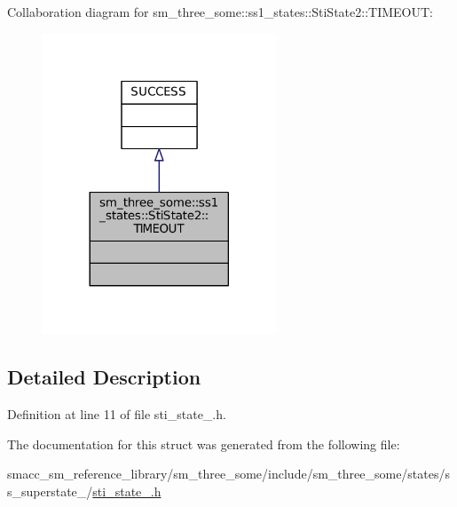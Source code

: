 Collaboration diagram for sm\+\_\+three\+\_\+some\+:\+:ss1\+\_\+states\+:\+:Sti\+State2\+:\+:T\+I\+M\+E\+O\+UT\+:
\nopagebreak
\begin{figure}[H]
\begin{center}
\leavevmode
\includegraphics[width=197pt]{structsm__three__some_1_1ss1__states_1_1StiState2_1_1TIMEOUT__coll__graph}
\end{center}
\end{figure}


\subsection{Detailed Description}


Definition at line 11 of file sti\+\_\+state\+\_.\+h.



The documentation for this struct was generated from the following file\+:\begin{DoxyCompactItemize}
\item 
smacc\+\_\+sm\+\_\+reference\+\_\+library/sm\+\_\+three\+\_\+some/include/sm\+\_\+three\+\_\+some/states/ss\+\_\+superstate\+\_/\hyperlink{sti__state__2_8h}{sti\+\_\+state\+\_.\+h}\end{DoxyCompactItemize}
